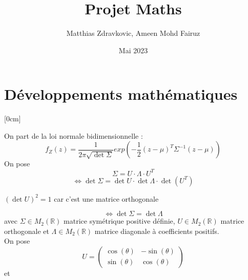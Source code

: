\documentclass{article}
\title{Projet Maths}
\author{Matthias Zdravkovic, Ameen Mohd Fairuz}
\date{Mai 2023}
\begin{document}
\maketitle

\section{Développements mathématiques}

\reversemarginpar{}[0cm]

On part de la loi normale bidimensionnelle :
$$f_Z(z) = \frac{1}{2\pi \sqrt{\det \Sigma}}exp(-\frac{1}{2}(z-\mu)^T\Sigma^{-1}(z-\mu))$$
On pose
$$\Sigma = U \cdot \Lambda \cdot U^T$$
$$ \Leftrightarrow \det \Sigma = \det U \cdot \det \Lambda \cdot \det (U^T) $$
\begin{center}
$(\det U)^{2}=1$ car c'est une matrice orthogonale
\end{center}
$$\Leftrightarrow \det \Sigma =\det \Lambda$$
avec $\Sigma \in M_2(\mathbb{R})$ matrice symétrique positive définie, $U \in M_2(\mathbb{R})$ matrice orthogonale et $\Lambda \in M_2(\mathbb{R})$ matrice diagonale à coefficients positifs.\\
On pose
\[
U = \begin{pmatrix}
    \cos(\theta) & -\sin(\theta) \\
    \sin(\theta) & \cos(\theta)
\end{pmatrix}
\]
et 
\end{document}
